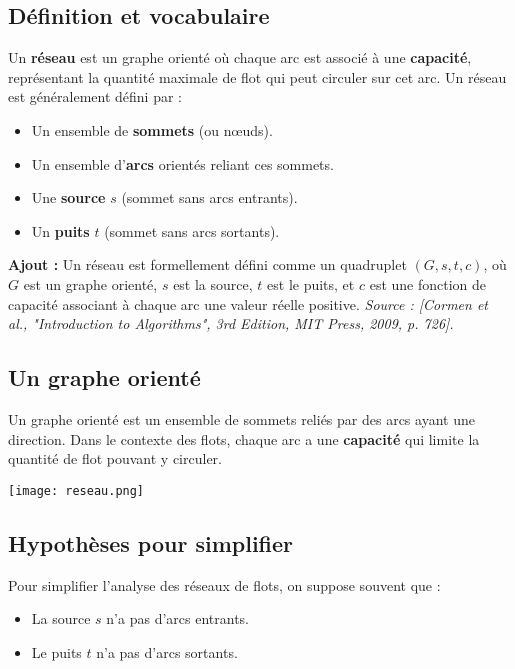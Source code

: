\documentclass[10pt,a4paper]{article}
\begin{document}
\subsection*{Définition et vocabulaire}

Un \textbf{réseau} est un graphe orienté où chaque arc est associé à une \textbf{capacité}, représentant la quantité maximale de flot qui peut circuler sur cet arc. Un réseau est généralement défini par :
\begin{itemize}
    \item Un ensemble de \textbf{sommets} (ou nœuds).
    \item Un ensemble d'\textbf{arcs} orientés reliant ces sommets.
    \item Une \textbf{source} \( s \) (sommet sans arcs entrants).
    \item Un \textbf{puits} \( t \) (sommet sans arcs sortants).
\end{itemize}

\textbf{Ajout :} Un réseau est formellement défini comme un quadruplet \( (G, s, t, c) \), où \( G \) est un graphe orienté, \( s \) est la source, \( t \) est le puits, et \( c \) est une fonction de capacité associant à chaque arc une valeur réelle positive. \textit{Source : [Cormen et al., "Introduction to Algorithms", 3rd Edition, MIT Press, 2009, p. 726].}


\subsection*{Un graphe orienté}

Un graphe orienté est un ensemble de sommets reliés par des arcs ayant une direction. Dans le contexte des flots, chaque arc a une \textbf{capacité} qui limite la quantité de flot pouvant y circuler.

\texttt{[image: reseau.png]}

\subsection*{Hypothèses pour simplifier}

Pour simplifier l'analyse des réseaux de flots, on suppose souvent que :
\begin{itemize}
    \item La source \( s \) n'a pas d'arcs entrants.
    \item Le puits \( t \) n'a pas d'arcs sortants.
\end{itemize}
\end{document}
